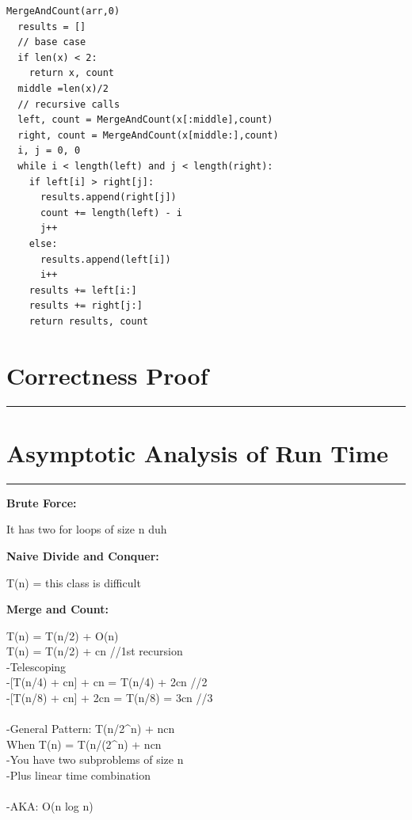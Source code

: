 \documentclass[letterpaper,10pt,titlepage,fleqn]{article}
\begin{document}
\begin{lstlisting}
MergeAndCount(arr,0)
  results = []
  // base case
  if len(x) < 2:
    return x, count
  middle =len(x)/2
  // recursive calls
  left, count = MergeAndCount(x[:middle],count)
  right, count = MergeAndCount(x[middle:],count)
  i, j = 0, 0
  while i < length(left) and j < length(right):
    if left[i] > right[j]:
      results.append(right[j])
      count += length(left) - i
      j++
    else:
      results.append(left[i])
      i++
    results += left[i:]
    results += right[j:]
    return results, count
\end{lstlisting}

\section*{Correctness Proof}
\hrule

\section*{Asymptotic Analysis of Run Time}
\hrule
\begin{centering}
\textbf{Brute Force:}
\end{centering}
It has two for loops of size n duh

\begin{centering}
\textbf{Naive Divide and Conquer:}
\end{centering}
T(n) = this class is difficult

\begin{centering}
\textbf{Merge and Count:}
\end{centering}
T(n) = T(n/2) + O(n) \\
T(n) = T(n/2) + cn //1st recursion \\
    -Telescoping \\
        -[T(n/4) + cn] + cn = T(n/4) + 2cn //2 \\
          -[T(n/8) + cn] + 2cn = T(n/8) = 3cn //3 \\
\\
    -General Pattern: T(n/2^n) + ncn\\

    When T(n) = T(n/(2^n) + ncn\\
        -You have two subproblems of size n\\
        -Plus linear time combination\\
\\
        -AKA: O(n log n)\\
\end{document}
